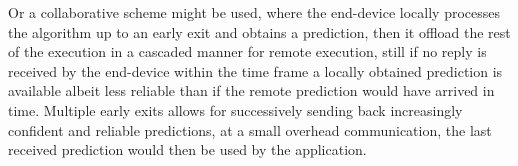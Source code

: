 Or a collaborative scheme might be used, where the end-device locally processes the algorithm up to an early exit and obtains a prediction, then it offload the rest of the execution in a cascaded manner for remote execution, still if no reply is received by the end-device within the time frame a locally obtained prediction is available albeit less reliable than if the remote prediction would have arrived in time. Multiple early exits allows for successively sending back increasingly confident and reliable predictions, at a small overhead communication, the last received prediction would then be used by the application.